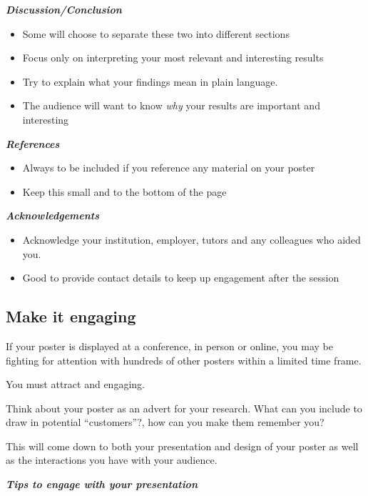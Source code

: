 \documentclass[
  titlepage]{book}
\providecommand{\tightlist}{%
  \setlength{\itemsep}{0pt}\setlength{\parskip}{0pt}}
\begin{document}
\textbf{\emph{Discussion/Conclusion}}

\begin{itemize}
\tightlist
\item
  Some will choose to separate these two into different sections
\item
  Focus only on interpreting your most relevant and interesting results
\item
  Try to explain what your findings mean in plain language.
\item
  The audience will want to know \emph{why} your results are important and interesting
\end{itemize}

\textbf{\emph{References}}

\begin{itemize}
\tightlist
\item
  Always to be included if you reference any material on your poster
\item
  Keep this small and to the bottom of the page
\end{itemize}

\textbf{\emph{Acknowledgements}}

\begin{itemize}
\tightlist
\item
  Acknowledge your institution, employer, tutors and any colleagues who aided you.
\item
  Good to provide contact details to keep up engagement after the session
\end{itemize}

\hypertarget{make-it-engaging}{%
\subsection{Make it engaging}\label{make-it-engaging}}

If your poster is displayed at a conference, in person or online, you may be fighting for attention with hundreds of other posters within a limited time frame.

You must attract and engaging.

Think about your poster as an advert for your research. What can you include to draw in potential ``customers''?, how can you make them remember you?

This will come down to both your presentation and design of your poster as well as the interactions you have with your audience.

\textbf{\emph{Tips to engage with your presentation}}
\end{document}
